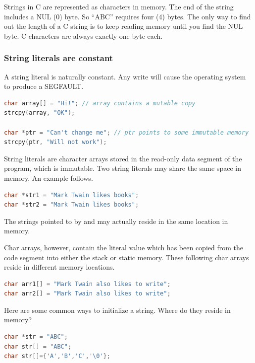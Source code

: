 Strings in C are represented as characters in memory.
The end of the string includes a NUL (0) byte.
So ``ABC'' requires four (4) bytes.
The only way to find out the length of a C string is to keep reading memory until you find the NUL byte.
C characters are always exactly one byte each.

\subsubsection{String literals are constant}

A string literal is naturally constant.
Any write will cause the operating system to produce a SEGFAULT. 

\begin{lstlisting}[language=C]
char array[] = "Hi!"; // array contains a mutable copy
strcpy(array, "OK");

char *ptr = "Can't change me"; // ptr points to some immutable memory
strcpy(ptr, "Will not work");
\end{lstlisting}

String literals are character arrays stored in the read-only data segment of the program, which is immutable.
Two string literals may share the same space in memory.
An example follows.

\begin{lstlisting}[language=C]
char *str1 = "Mark Twain likes books";
char *str2 = "Mark Twain likes books";
\end{lstlisting}

The strings pointed to by  and  may actually reside in the same location in memory.

Char arrays, however, contain the literal value which has been copied from the code segment into either the stack or static memory.
These following char arrays reside in different memory locations.

\begin{lstlisting}[language=C]
char arr1[] = "Mark Twain also likes to write";
char arr2[] = "Mark Twain also likes to write";
\end{lstlisting}

Here are some common ways to initialize a string. Where do they reside in memory?

\begin{lstlisting}[language=C]
char *str = "ABC";
char str[] = "ABC";
char str[]={'A','B','C','\0'};
\end{lstlisting}

